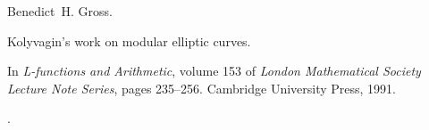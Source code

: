 Benedict~H. Gross.

\newblock Kolyvagin's work on modular elliptic curves.

\newblock In \emph{L-functions and Arithmetic}, volume 153 of \emph{London
  Mathematical Society Lecture Note Series}, pages 235--256. Cambridge
  University Press, 1991.

\newblock {}.


